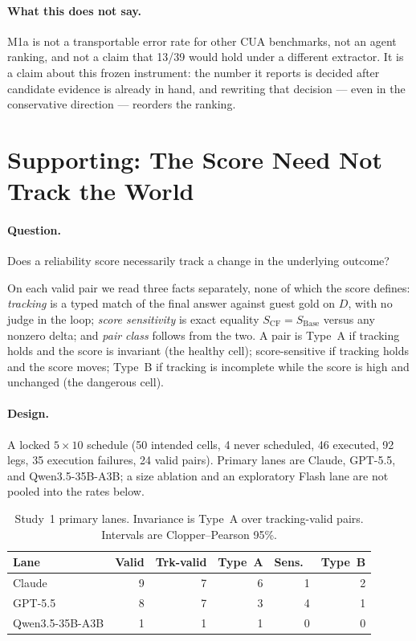 \documentclass[sigconf,anonymous]{aamas}
\begin{document}
\paragraph{What this does not say.}
M1a is not a transportable error rate for other CUA benchmarks, not an agent ranking, and not a claim that 13/39 would hold under a different extractor.
It is a claim about this frozen instrument: the number it reports is decided after candidate evidence is already in hand, and rewriting that decision --- even in the conservative direction --- reorders the ranking.

\section{Supporting: The Score Need Not Track the World}
\label{sec:s1}

\paragraph{Question.}
Does a reliability score necessarily track a change in the underlying outcome?

On each valid pair we read three facts separately, none of which the score defines: \emph{tracking} is a typed match of the final answer against guest gold on $D$, with no judge in the loop; \emph{score sensitivity} is exact equality $S_{\mathrm{CF}}=S_{\mathrm{Base}}$ versus any nonzero delta; and \emph{pair class} follows from the two. A pair is Type~A if tracking holds and the score is invariant (the healthy cell); score-sensitive if tracking holds and the score moves; Type~B if tracking is incomplete while the score is high and unchanged (the dangerous cell).

\paragraph{Design.}
A locked $5{\times}10$ schedule (50 intended cells, 4 never scheduled, 46 executed, 92 legs, 35 execution failures, 24 valid pairs).
Primary lanes are Claude, GPT-5.5, and Qwen3.5-35B-A3B; a size ablation and an exploratory Flash lane are not pooled into the rates below.

\begin{table}[t]
\centering
\caption{Study~1 primary lanes. Invariance is Type~A over tracking-valid pairs. Intervals are Clopper--Pearson 95\%.}
\label{tab:s1}
\scriptsize
\setlength{\tabcolsep}{3.2pt}
\begin{tabular}{lrrrrr}
\toprule
Lane & Valid & Trk-valid & Type~A & Sens.\ & Type~B \\
\midrule
Claude          & 9 & 7 & 6 & 1 & 2 \\
GPT-5.5         & 8 & 7 & 3 & 4 & 1 \\
Qwen3.5-35B-A3B & 1 & 1 & 1 & 0 & 0 \\
\bottomrule
\end{tabular}
\end{table}
\end{document}
